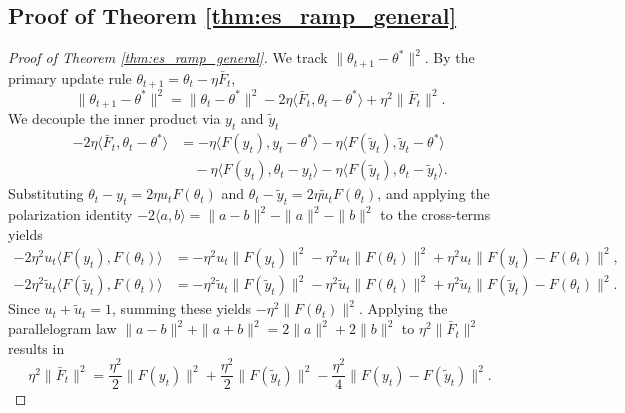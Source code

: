 \documentclass[letter,11pt]{article}
\begin{document}
\subsection{Proof of Theorem \ref{thm:es_ramp_general}}\label{sec:es_ramp_general}
\begin{proof}[Proof of Theorem \ref{thm:es_ramp_general}]
We track $\|\theta_{t+1} - \theta^*\|^2$. By the primary update rule $\theta_{t+1} = \theta_t - \eta \bar{F}_t$,
\begin{equation} \label{eq:esramp_base}
\|\theta_{t+1} - \theta^*\|^2 = \|\theta_t - \theta^*\|^2 - 2\eta \langle \bar{F}_t, \theta_t - \theta^* \rangle + \eta^2 \|\bar{F}_t\|^2.
\end{equation}
We decouple the inner product via $y_t$ and $\tilde{y}_t$
\begin{equation}
\begin{aligned}
-2\eta \langle \bar{F}_t, \theta_t - \theta^* \rangle &= -\eta \langle F(y_t), y_t - \theta^* \rangle - \eta \langle F(\tilde{y}_t), \tilde{y}_t - \theta^* \rangle \\
&\quad - \eta \langle F(y_t), \theta_t - y_t \rangle - \eta \langle F(\tilde{y}_t), \theta_t - \tilde{y}_t \rangle.
\end{aligned}
\end{equation}
Substituting $\theta_t - y_t = 2\eta u_t F(\theta_t)$ and $\theta_t - \tilde{y}_t = 2\eta \tilde{u}_t F(\theta_t)$, and applying the polarization identity $-2\langle a, b \rangle = \|a-b\|^2 - \|a\|^2 - \|b\|^2$ to the cross-terms yields
\begin{equation}
\begin{aligned}
-2\eta^2 u_t \langle F(y_t), F(\theta_t) \rangle &= -\eta^2 u_t \|F(y_t)\|^2 - \eta^2 u_t \|F(\theta_t)\|^2 + \eta^2 u_t \|F(y_t) - F(\theta_t)\|^2, \\
-2\eta^2 \tilde{u}_t \langle F(\tilde{y}_t), F(\theta_t) \rangle &= -\eta^2 \tilde{u}_t \|F(\tilde{y}_t)\|^2 - \eta^2 \tilde{u}_t \|F(\theta_t)\|^2 + \eta^2 \tilde{u}_t \|F(\tilde{y}_t) - F(\theta_t)\|^2.
\end{aligned}
\end{equation}
Since $u_t + \tilde{u}_t = 1$, summing these yields $-\eta^2 \|F(\theta_t)\|^2$. Applying the parallelogram law $\|a-b\|^2+\|a+b\|^2 = 2 \|a\|^2 + 2 \|b\|^2$ to $\eta^2 \|\bar{F}_t\|^2$ results in
\begin{equation}
\eta^2 \|\bar{F}_t\|^2 = \frac{\eta^2}{2}\|F(y_t)\|^2 + \frac{\eta^2}{2}\|F(\tilde{y}_t)\|^2 - \frac{\eta^2}{4}\|F(y_t) - F(\tilde{y}_t)\|^2.
\end{equation}

\end{proof}
\end{document}
